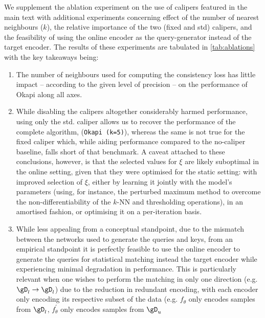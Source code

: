  We supplement the ablation experiment on the use of calipers featured in the main text with
 additional experiments concerning effect of the number of nearest neighbours ($k$), the relative
 importance of the two (fixed and std) calipers, and the feasibility of using the online encoder as
 the query-generator instead of the target encoder.
 The results of these experiments are tabulated in \ref{tab:ablations} with the key takeaways
 being: \begin{enumerate} 
     \item The number of neighbours used for computing the consistency loss
         has little impact -- according to the given level of precision -- on the performance of Okapi
        along all axes.
     \item While disabling the calipers altogether considerably harmed performance, using only the
         std. caliper allows us to recover the performance of the complete algorithm,
         (\texttt{Okapi (k=5)}), whereas the same is not true for the fixed caliper which, while
         aiding performance compared to the no-caliper baseline, falls short of that benchmark.
         A caveat attached to these conclusions, however, is that the selected values for $\xi$ are
         likely suboptimal in the online setting, given that they were optimised for the static
         setting: with improved selection of $\xi$, either by learning it jointly with the model's
         parameters (using, for instance, the perturbed maximum method \citep{berthet2020learning}
         to overcome the non-differentiability of the $k$-NN and thresholding operations), in an
         amortised fashion, or optimising it on a per-iteration basis.
    \item While less appealing from a conceptual standpoint, due to the mismatch between the
        networks used to generate the queries and keys, from an empirical standpoint it is
        perfectly feasible to use the online encoder to generate the queries for statistical
        matching instead the target encoder while experiencing minimal degradation in performance.
        This is particularly relevant when one wishes to perform the matching in only one direction
        (e.g. \( \gD_l \rightarrow \gD_l \)) due to the reduction in redundant encoding, with each
        encoder only encoding its respective subset of the data (e.g. $f_\theta$ only encodes
        samples from $\gD_l$, \( f_\theta^\prime \) only encodes samples from \( \gD_u \)
\end{enumerate}


